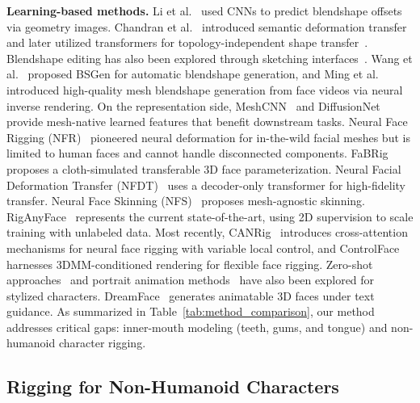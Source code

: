 \documentclass[acmtog,anonymous,review]{acmart}
\begin{document}
\textbf{Learning-based methods.} Li et al.~\cite{li2020dynamic} used CNNs to predict blendshape offsets via geometry images. Chandran et al.~\cite{chandran2022shape, chandran2020semantic} introduced semantic deformation transfer and later utilized transformers for topology-independent shape transfer~\cite{chandran2022local}. Blendshape editing has also been explored through sketching interfaces~\cite{cetinaslan2020sketching, cetinaslan2020stabilized}. Wang et al.~\cite{wang2023fully} proposed BSGen for automatic blendshape generation, and Ming et al.~\cite{ming2024high} introduced high-quality mesh blendshape generation from face videos via neural inverse rendering. On the representation side, MeshCNN~\cite{hanocka2019meshcnn} and DiffusionNet~\cite{sharp2022diffusionnet} provide mesh-native learned features that benefit downstream tasks. Neural Face Rigging (NFR)~\cite{qin2023neural} pioneered neural deformation for in-the-wild facial meshes but is limited to human faces and cannot handle disconnected components. FaBRig~\cite{zhu2024fabrig} proposes a cloth-simulated transferable 3D face parameterization. Neural Facial Deformation Transfer (NFDT)~\cite{chandran2025neural} uses a decoder-only transformer for high-fidelity transfer. Neural Face Skinning (NFS)~\cite{cha2025neural} proposes mesh-agnostic skinning. RigAnyFace~\cite{ma2025riganyface} represents the current state-of-the-art, using 2D supervision to scale training with unlabeled data. Most recently, CANRig~\cite{canrig2026} introduces cross-attention mechanisms for neural face rigging with variable local control, and ControlFace~\cite{jang2025controlface} harnesses 3DMM-conditioned rendering for flexible face rigging. Zero-shot approaches~\cite{wang2023zeroshot} and portrait animation methods~\cite{yang2024megactor} have also been explored for stylized characters. DreamFace~\cite{zhang2023dreamface} generates animatable 3D faces under text guidance. As summarized in Table~\ref{tab:method_comparison}, our method addresses critical gaps: inner-mouth modeling (teeth, gums, and tongue) and non-humanoid character rigging.

\subsection{Rigging for Non-Humanoid Characters}
\end{document}
